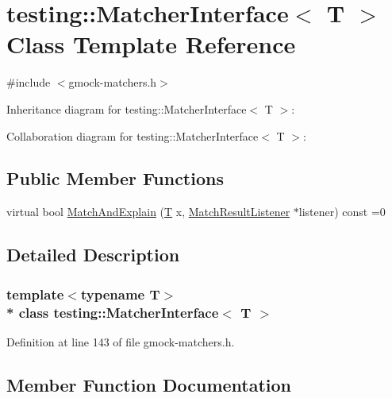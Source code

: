 \hypertarget{classtesting_1_1_matcher_interface}{}\section{testing\+:\+:Matcher\+Interface$<$ T $>$ Class Template Reference}
\label{classtesting_1_1_matcher_interface}


{\ttfamily \#include $<$gmock-\/matchers.\+h$>$}



Inheritance diagram for testing\+:\+:Matcher\+Interface$<$ T $>$\+:


Collaboration diagram for testing\+:\+:Matcher\+Interface$<$ T $>$\+:
\subsection*{Public Member Functions}
\begin{DoxyCompactItemize}
\item 
virtual bool \hyperlink{classtesting_1_1_matcher_interface_a296b43607cd99d60365f0e6a762777cf}{Match\+And\+Explain} (\hyperlink{functions__7_8js_adf1f3edb9115acb0a1e04209b7a9937b}{T} x, \hyperlink{classtesting_1_1_match_result_listener}{Match\+Result\+Listener} $\ast$listener) const =0
\end{DoxyCompactItemize}


\subsection{Detailed Description}
\subsubsection*{template$<$typename T$>$\\*
class testing\+::\+Matcher\+Interface$<$ T $>$}



Definition at line 143 of file gmock-\/matchers.\+h.



\subsection{Member Function Documentation}
